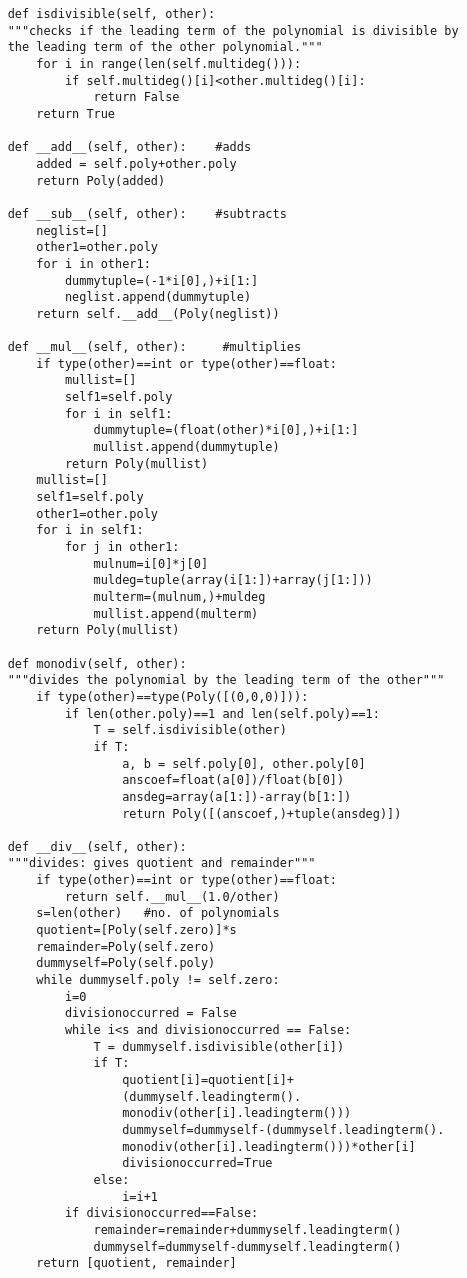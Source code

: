 \documentclass[12pt,a4paper]{article}
\theoremstyle{definition}
\begin{document}
\begin{verbatim}
    def isdivisible(self, other):        
    """checks if the leading term of the polynomial is divisible by 
    the leading term of the other polynomial."""
        for i in range(len(self.multideg())):
            if self.multideg()[i]<other.multideg()[i]:
                return False
        return True

    def __add__(self, other):    #adds
        added = self.poly+other.poly
        return Poly(added)

    def __sub__(self, other):    #subtracts 
        neglist=[]
        other1=other.poly
        for i in other1:
            dummytuple=(-1*i[0],)+i[1:]
            neglist.append(dummytuple)
        return self.__add__(Poly(neglist))

    def __mul__(self, other):     #multiplies
        if type(other)==int or type(other)==float:
            mullist=[]
            self1=self.poly
            for i in self1:
                dummytuple=(float(other)*i[0],)+i[1:]
                mullist.append(dummytuple)
            return Poly(mullist)
        mullist=[]
        self1=self.poly
        other1=other.poly
        for i in self1:
            for j in other1:
                mulnum=i[0]*j[0]
                muldeg=tuple(array(i[1:])+array(j[1:]))
                multerm=(mulnum,)+muldeg
                mullist.append(multerm)
        return Poly(mullist)

    def monodiv(self, other):       
    """divides the polynomial by the leading term of the other"""
        if type(other)==type(Poly([(0,0,0)])):
            if len(other.poly)==1 and len(self.poly)==1:
                T = self.isdivisible(other)
                if T:
                    a, b = self.poly[0], other.poly[0] 
                    anscoef=float(a[0])/float(b[0])
                    ansdeg=array(a[1:])-array(b[1:])
                    return Poly([(anscoef,)+tuple(ansdeg)])

    def __div__(self, other):
    """divides: gives quotient and remainder"""
        if type(other)==int or type(other)==float:
            return self.__mul__(1.0/other)             
        s=len(other)   #no. of polynomials
        quotient=[Poly(self.zero)]*s
        remainder=Poly(self.zero)
        dummyself=Poly(self.poly)
        while dummyself.poly != self.zero:
            i=0
            divisionoccurred = False
            while i<s and divisionoccurred == False:
                T = dummyself.isdivisible(other[i])
                if T:
                    quotient[i]=quotient[i]+
                    (dummyself.leadingterm().
                    monodiv(other[i].leadingterm()))
                    dummyself=dummyself-(dummyself.leadingterm().
                    monodiv(other[i].leadingterm()))*other[i]
                    divisionoccurred=True
                else:
                    i=i+1
            if divisionoccurred==False:
                remainder=remainder+dummyself.leadingterm()
                dummyself=dummyself-dummyself.leadingterm()
        return [quotient, remainder]


\end{verbatim}
\end{document}
